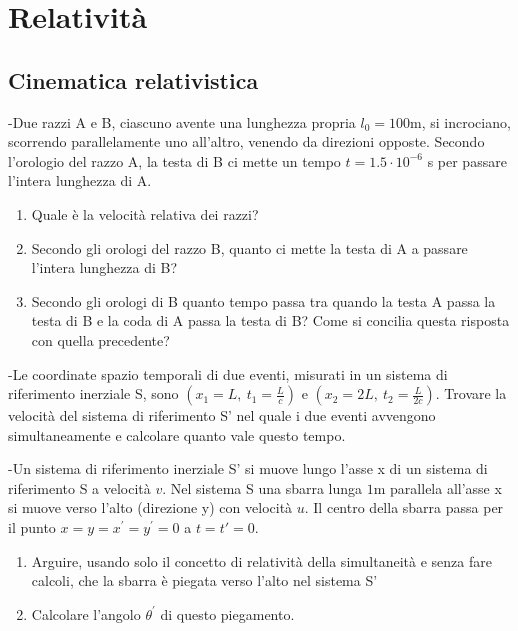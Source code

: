 \documentclass[12pt,twoside,a4]{article}
\begin{document}
\setcounter{tocdepth}{2}

\vspace*{\fill} 
\pagestyle{empty}
\vspace*{\fill}
\tableofcontents 
\vspace*{\fill}


\pagestyle{thesis}
\section{Relatività }
\subsection{Cinematica relativistica}

\begin{esercizio}
	-Due razzi A e B, ciascuno avente una lunghezza propria $l_0 = 100$m, si incrociano, scorrendo parallelamente uno all'altro, venendo da direzioni opposte. Secondo l'orologio del razzo A, la testa di B ci mette un tempo $t = 1.5 \cdot 10^{-6}$ s per passare l'intera lunghezza di A.
	\begin{enumerate}[label=(\textit{\roman*})]
		\item Quale è la velocità  relativa dei razzi?
		\item Secondo gli orologi del razzo B, quanto ci mette la testa di A a passare l'intera lunghezza di B?
		\item Secondo gli orologi di B quanto tempo passa tra quando la testa A passa la testa di B e la coda di A passa la testa di B? Come si concilia questa risposta con quella precedente?
	\end{enumerate}
\end{esercizio}

\begin{esercizio}
	-Le coordinate spazio temporali di due eventi, misurati in un sistema di riferimento inerziale S, sono $(x_1=L, \ t_1 = \frac{L}{c})$ e $(x_2=2L,\  t_2 = \frac{L}{2c})$. Trovare la velocità  del sistema di riferimento S' nel quale i due eventi avvengono simultaneamente e calcolare quanto vale questo tempo.
\end{esercizio}

\begin{esercizio}
	-Un sistema di riferimento inerziale S' si muove lungo l'asse x di un sistema di riferimento S a velocità  $v$. Nel sistema S una sbarra lunga $1$m parallela all'asse x si muove verso l'alto (direzione y) con velocità  $u$. Il centro della sbarra passa per il punto $x=y=x^\prime =y^\prime =0$ a $t=t' =0.$
	\begin{enumerate}[label=(\textit{\roman*})]
		\item Arguire, usando solo il concetto di relatività  della simultaneità  e senza fare calcoli, che la sbarra è piegata verso l'alto nel sistema S'
		\item Calcolare l'angolo $\theta ^\prime$ di questo piegamento.
	\end{enumerate}
\end{esercizio}
\end{document}
